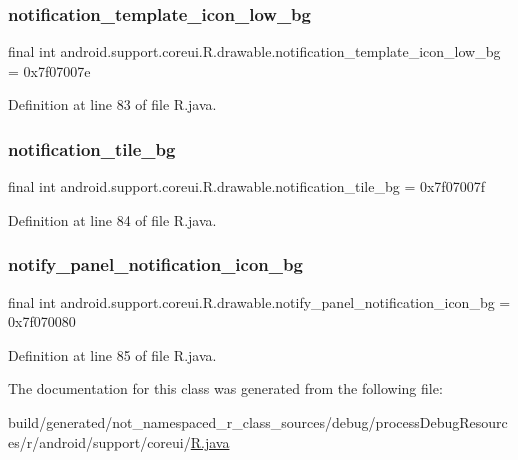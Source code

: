 \subsubsection{\texorpdfstring{notification\_template\_icon\_low\_bg}{notification\_template\_icon\_low\_bg}}
{\footnotesize\ttfamily final int android.\+support.\+coreui.\+R.\+drawable.\+notification\+\_\+template\+\_\+icon\+\_\+low\+\_\+bg = 0x7f07007e\hspace{0.3cm}{\ttfamily [static]}}



Definition at line 83 of file R.\+java.

\mbox{\label{classandroid_1_1support_1_1coreui_1_1_r_1_1drawable_aa40d9d7403b9046f03181c7e8fa6b217}} 
\subsubsection{\texorpdfstring{notification\_tile\_bg}{notification\_tile\_bg}}
{\footnotesize\ttfamily final int android.\+support.\+coreui.\+R.\+drawable.\+notification\+\_\+tile\+\_\+bg = 0x7f07007f\hspace{0.3cm}{\ttfamily [static]}}



Definition at line 84 of file R.\+java.

\mbox{\label{classandroid_1_1support_1_1coreui_1_1_r_1_1drawable_a8fad725edb38a205968e9df2ec8754fc}} 
\subsubsection{\texorpdfstring{notify\_panel\_notification\_icon\_bg}{notify\_panel\_notification\_icon\_bg}}
{\footnotesize\ttfamily final int android.\+support.\+coreui.\+R.\+drawable.\+notify\+\_\+panel\+\_\+notification\+\_\+icon\+\_\+bg = 0x7f070080\hspace{0.3cm}{\ttfamily [static]}}



Definition at line 85 of file R.\+java.



The documentation for this class was generated from the following file\+:\begin{DoxyCompactItemize}
\item 
build/generated/not\+\_\+namespaced\+\_\+r\+\_\+class\+\_\+sources/debug/process\+Debug\+Resources/r/android/support/coreui/\mbox{\hyperlink{android_2support_2coreui_2_r_8java}{R.\+java}}\end{DoxyCompactItemize}
